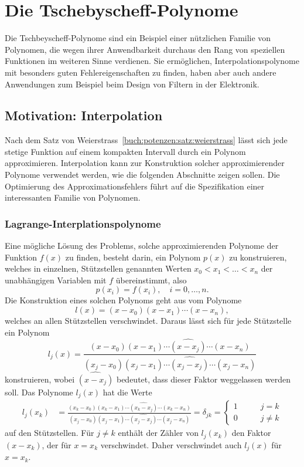 %
%
%
\section{Die Tschebyscheff-Polynome
\label{buch:polynome:section:tschebyscheff}}
Die Tschbeyscheff-Polynome sind ein Beispiel einer nützlichen Familie
von Polynomen, die wegen ihrer Anwendbarkeit durchaus den Rang von
speziellen Funktionen im weiteren Sinne verdienen.
Sie ermöglichen, Interpolationspolynome mit besonders guten
Fehlereigenschaften zu finden, haben aber auch andere Anwendungen
zum Beispiel beim Design von Filtern in der Elektronik.

\subsection{Motivation: Interpolation}
Nach dem Satz von Weierstrass~\ref{buch:potenzen:satz:weierstrass}
lässt sich jede stetige Funktion auf einem kompakten Intervall durch
ein Polynom approximieren.
Interpolation kann zur Konstruktion solcher approximierender Polynome
verwendet werden, wie die folgenden Abschnitte zeigen sollen.
Die Optimierung des Approximationsfehlers führt auf die Spezifikation
einer interessanten Familie von Polynomen.

\subsubsection{Lagrange-Interplationspolynome}
Eine mögliche Lösung des Problems, solche approximierenden Polynome
der Funktion $f(x)$
zu finden, besteht darin, ein Polynom $p(x)$ zu konstruieren, welches
in einzelnen, Stützstellen genannten Werten $x_0<x_1<\dots<x_n$ der
unabhängigen Variablen mit $f$ übereinstimmt, also
\[
p(x_i) = f(x_i), \quad i=0,\dots,n.
\]
Die Konstruktion eines solchen Polynoms geht aus vom Polynome
\[
l(x) = (x-x_0)(x-x_1)\cdots(x-x_n),
\]
welches an allen Stützstellen verschwindet.
Daraus lässt sich für jede Stützstelle ein Polynom
\[
l_j(x)
=
\frac{
(x-x_0)(x-x_1)\cdots\widehat{(x-x_j)}\cdots(x-x_n)
}{
(x_j-x_0)(x_j-x_1)\cdots\widehat{(x_j-x_j)}\cdots(x_j-x_n)
}
\]
konstruieren, wobei $\widehat{(x-x_j)}$ bedeutet, dass dieser Faktor
weggelassen werden soll.
Das Polynome $l_j(x)$ hat die Werte
\begin{align}
l_j(x_k)
&=
\frac{
(x_k-x_0)(x_k-x_1)\cdots\widehat{(x_k-x_j)}\cdots(x_k-x_n)
}{
(x_j-x_0)(x_j-x_1)\cdots\widehat{(x_j-x_j)}\cdots(x_j-x_n)
}
=
\delta_{jk}
=
\begin{cases}
1&\qquad j=k\\
0&\qquad j\ne k
\end{cases}
\label{buch:potenzen:interpolation:lj}
\end{align}
auf den Stützstellen.
Für $j\ne k$ enthält der Zähler von $l_j(x_k)$ den Faktor
$(x-x_k)$, der für $x=x_k$ verschwindet.
Daher verschwindet auch $l_j(x)$ für $x=x_k$.

